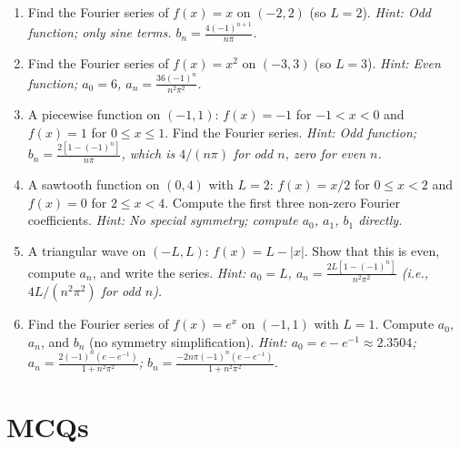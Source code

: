 \documentclass[12pt,a4paper]{article}
\begin{document}
\begin{enumerate}[leftmargin=*]

\item Find the Fourier series of $f(x) = x$ on $(-2, 2)$ (so $L = 2$).
\textit{Hint: Odd function; only sine terms. $b_n = \frac{4(-1)^{n+1}}{n\pi}$.}

\item Find the Fourier series of $f(x) = x^2$ on $(-3, 3)$ (so $L = 3$).
\textit{Hint: Even function; $a_0 = 6$, $a_n = \frac{36(-1)^n}{n^2\pi^2}$.}

\item A piecewise function on $(-1,1)$: $f(x) = -1$ for $-1 < x < 0$ and $f(x) = 1$ for $0 \le x \le 1$.
Find the Fourier series.
\textit{Hint: Odd function; $b_n = \frac{2[1-(-1)^n]}{n\pi}$, which is $4/(n\pi)$ for odd $n$, zero for even $n$.}

\item A sawtooth function on $(0, 4)$ with $L = 2$: $f(x) = x/2$ for $0 \le x < 2$ and $f(x) = 0$ for $2 \le x < 4$.
Compute the first three non-zero Fourier coefficients.
\textit{Hint: No special symmetry; compute $a_0$, $a_1$, $b_1$ directly.}

\item A triangular wave on $(-L, L)$: $f(x) = L - |x|$.
Show that this is even, compute $a_n$, and write the series.
\textit{Hint: $a_0 = L$, $a_n = \frac{2L[1-(-1)^n]}{n^2\pi^2}$ (i.e., $4L/(n^2\pi^2)$ for odd $n$).}

\item Find the Fourier series of $f(x) = e^x$ on $(-1, 1)$ with $L = 1$.
Compute $a_0$, $a_n$, and $b_n$ (no symmetry simplification).
\textit{Hint: $a_0 = e - e^{-1} \approx 2.3504$; $a_n = \frac{2(-1)^n(e-e^{-1})}{1+n^2\pi^2}$; $b_n = \frac{-2n\pi(-1)^n(e-e^{-1})}{1+n^2\pi^2}$.}

\end{enumerate}

\section{MCQs}
\end{document}
